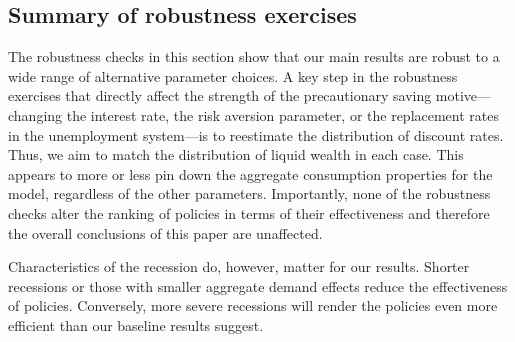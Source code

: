 \documentclass[\latexroot/\projectname]{subfiles}
\begin{document}
%
%

\hypertarget{summary-of-robustness-exercises}{}\par\subsection*{Summary of robustness exercises}
\whenintegrated{\label{sec:robust_summary}} 

The robustness checks in this section show that our main results are robust to a wide range of alternative parameter choices.
A key step in the robustness exercises that directly affect the strength of the precautionary saving motive---changing the interest rate, the risk aversion parameter, or the replacement rates in the unemployment system---is to reestimate the distribution of discount rates.
Thus, we aim to match the distribution of liquid wealth in each case.
This appears to more or less pin down the aggregate consumption properties for the model, regardless of the other parameters.
Importantly, none of the robustness checks alter the ranking of policies in terms of their effectiveness and therefore the overall conclusions of this paper are unaffected.

Characteristics of the recession do, however, matter for our results.
Shorter recessions or those with smaller aggregate demand effects reduce the effectiveness of policies.
Conversely, more severe recessions will render the policies even more efficient than our baseline results suggest.

\smartbib
\end{document}

